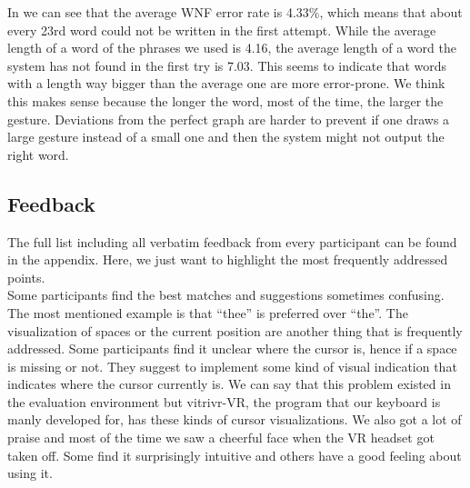 In  we can see that the average WNF error rate is 4.33\%, which means that about every 23rd word could not be written in the first attempt. While the average length of a word of the phrases we used is 4.16, the average length of a word the system has not found in the first try is 7.03. This seems to indicate that words with a length way bigger than the average one are more error-prone. We think this makes sense because the longer the word, most of the time, the larger the gesture. Deviations from the perfect graph are harder to prevent if one draws a large gesture instead of a small one and then the system might not output the right word.

\subsection{Feedback}
The full list including all verbatim feedback from every participant can be found in the appendix. Here, we just want to highlight the most frequently addressed points.\\
Some participants find the best matches and suggestions sometimes confusing. The most mentioned example is that ``thee'' is preferred over ``the''. The visualization of spaces or the current position are another thing that is frequently addressed. Some participants find it unclear where the cursor is, hence if a space is missing or not. They suggest to implement some kind of visual indication that indicates where the cursor currently is. We can say that this problem existed in the evaluation environment but vitrivr-VR, the program that our keyboard is manly developed for, has these kinds of cursor visualizations. We also got a lot of praise and most of the time we saw a cheerful face when the VR headset got taken off. Some find it surprisingly intuitive and others have a good feeling about using it.

